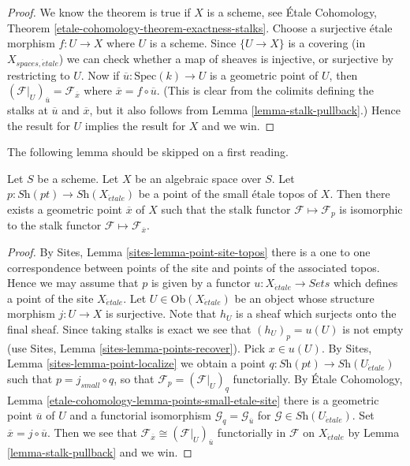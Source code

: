 \begin{proof}
We know the theorem is true if $X$ is a scheme, see
\'Etale Cohomology, Theorem \ref{etale-cohomology-theorem-exactness-stalks}.
Choose a surjective \'etale morphism $f : U \to X$ where $U$ is a scheme.
Since $\{U \to X\}$ is a covering (in $X_{spaces, \acute{e}tale}$) we can check
whether a map of sheaves is injective, or surjective by restricting
to $U$. Now if $\overline{u} : \text{Spec}(k) \to U$ is a geometric
point of $U$, then
$(\mathcal{F}|_U)_{\overline{u}} = \mathcal{F}_{\overline{x}}$
where $\overline{x} = f \circ \overline{u}$. (This is clear from the
colimits defining the stalks at $\overline{u}$ and $\overline{x}$, but
it also follows from
Lemma \ref{lemma-stalk-pullback}.)
Hence the result for $U$ implies the result for $X$ and we win.
\end{proof}

\noindent
The following lemma should be skipped on a first reading.

\begin{lemma}
\label{lemma-points-small-etale-site}
Let $S$ be a scheme.
Let $X$ be an algebraic space over $S$.
Let $p : \textit{Sh}(pt) \to \textit{Sh}(X_{\acute{e}tale})$
be a point of the small \'etale topos of $X$.
Then there exists a geometric point $\overline{x}$ of $X$
such that the stalk functor $\mathcal{F} \mapsto \mathcal{F}_p$
is isomorphic to the stalk functor
$\mathcal{F} \mapsto \mathcal{F}_{\overline{x}}$.
\end{lemma}

\begin{proof}
By
Sites, Lemma \ref{sites-lemma-point-site-topos}
there is a one to one correspondence between points of the site and points
of the associated topos. Hence we may assume that $p$ is given by
a functor $u : X_{\acute{e}tale} \to \textit{Sets}$ which defines a point
of the site $X_{\acute{e}tale}$.
Let $U \in \text{Ob}(X_{\acute{e}tale})$ be an object whose structure morphism
$j : U \to X$ is surjective. Note that $h_U$ is a sheaf
which surjects onto the final sheaf. Since taking stalks is exact
we see that $(h_U)_p = u(U)$ is not empty (use
Sites, Lemma \ref{sites-lemma-points-recover}).
Pick $x \in u(U)$. By
Sites, Lemma \ref{sites-lemma-point-localize}
we obtain a point $q : \textit{Sh}(pt) \to \textit{Sh}(U_{\acute{e}tale})$
such that $p = j_{small} \circ q$, so that
$\mathcal{F}_p = (\mathcal{F}|_U)_q$ functorially.
By
\'Etale Cohomology, Lemma \ref{etale-cohomology-lemma-points-small-etale-site}
there is a geometric point $\overline{u}$ of $U$ and a functorial
isomorphism $\mathcal{G}_q = \mathcal{G}_{\overline{u}}$
for $\mathcal{G} \in \textit{Sh}(U_{\acute{e}tale})$. Set
$\overline{x} = j \circ \overline{u}$. Then we see that
$\mathcal{F}_{\overline{x}} \cong (\mathcal{F}|_U)_{\overline{u}}$
functorially in $\mathcal{F}$ on $X_{\acute{e}tale}$ by
Lemma \ref{lemma-stalk-pullback}
and we win.
\end{proof}





